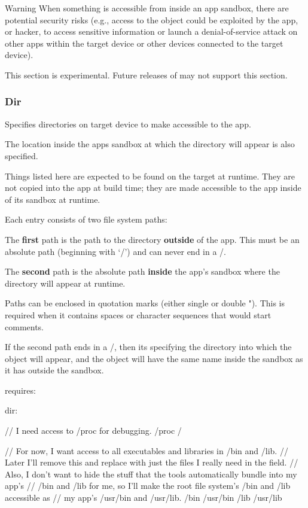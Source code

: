 \begin{DoxyWarning}{Warning}
When something is accessible from inside an app sandbox, there are potential security risks (e.\+g., access to the object could be exploited by the app, or hacker, to access sensitive information or launch a denial-\/of-\/service attack on other apps within the target device or other devices connected to the target device).

This section is experimental. Future releases of may not support this section.
\end{DoxyWarning}
\hypertarget{def_files_cdef_defFilesCdef_requiresDir}{}\subsubsection{Dir}\label{def_files_cdef_defFilesCdef_requiresDir}
Specifies directories on target device to make accessible to the app.

The location inside the app\textquotesingle{}s sandbox at which the directory will appear is also specified.

Things listed here are expected to be found on the target at runtime. They are not copied into the app at build time; they are made accessible to the app inside of its sandbox at runtime.

Each entry consists of two file system paths\+:


\begin{DoxyItemize}
\item The {\bfseries first} path is the path to the directory {\bfseries outside} of the app. This must be an absolute path (beginning with ‘/’) and can never end in a \textquotesingle{}/\textquotesingle{}.
\item The {\bfseries second} path is the absolute path {\bfseries inside} the app’s sandbox where the directory will appear at runtime.
\end{DoxyItemize}

Paths can be enclosed in quotation marks (either single \textquotesingle{} or double "). This is required when it contains spaces or character sequences that would start comments.

If the second path ends in a \textquotesingle{}/\textquotesingle{}, then it\textquotesingle{}s specifying the directory into which the object will appear, and the object will have the same name inside the sandbox as it has outside the sandbox.

\begin{DoxyVerb}requires:
{
    dir:
    {
        // I need access to /proc for debugging.
        /proc   /

        // For now, I want access to all executables and libraries in /bin and /lib.
        // Later I'll remove this and replace with just the files I really need in the field.
        // Also, I don't want to hide the stuff that the tools automatically bundle into my app's
        // /bin and /lib for me, so I'll make the root file system's /bin and /lib accessible as
        // my app's /usr/bin and /usr/lib.
        /bin    /usr/bin
        /lib    /usr/lib
    }
}
\end{DoxyVerb}


